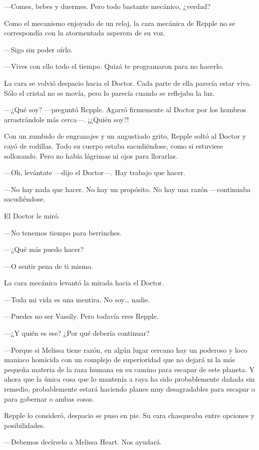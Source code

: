 {---Comes, bebes y duermes. Pero todo bastante mecánico, ¿verdad?}

{Como el mecanismo enjoyado de un reloj, la cara mecánica de Repple no
se correspondía con la atormentada aspereza de su voz.}

{---Sigo sin poder oírlo.}

{---Vives con ello todo el tiempo. Quizá te programaron para no
hacerlo.}

{La cara se volvió despacio hacia el Doctor. Cada parte de ella parecía
	estar viva. Sólo el cristal no se movía, pero lo parecía cuando se
reflejaba la luz.}

{---¿Qué soy? ---preguntó Repple. Agarró firmemente al Doctor por los
hombros arrastrándole más cerca---. ¡¿Quién soy?!}

{Con un zumbido de engranajes y un angustiado grito, Repple soltó al
	Doctor y cayó de rodillas. Todo su cuerpo estaba sacudiéndose, como si
estuviese sollozando. Pero no había lágrimas ni ojos para llorarlas.}

{---Oh, levántate ---dijo el Doctor---. Hay trabajo que hacer.}

{---No hay nada que hacer. No hay un propósito. No hay una razón
---continuaba sacudiéndose.}

{El Doctor le miró.}

{---No tenemos tiempo para berrinches.}

{---¿Qué más puedo hacer?}

{---O sentir pena de ti mismo.}

{La cara mecánica levantó la mirada hacia el Doctor.}

{---Toda mi vida es una mentira. No soy\ldots{} nadie.}

{---Puedes no ser Vassily. Pero todavía eres Repple.}

{---¿Y quién es ese? ¿Por qué debería continuar?}

{---Porque si Melissa tiene razón, en algún lugar cercano hay un
	poderoso y loco maniaco homicida con un complejo de superioridad que no
	dejará ni la más pequeña materia de la raza humana en su camino para
	escapar de este planeta. Y ahora que la única cosa que lo mantenía a
	raya ha sido probablemente dañada sin remedio, probablemente estará
	haciendo planes muy desagradables para escapar o para gobernar o ambas
cosas.}

{Repple lo consideró, despacio se puso en pie. Su cara chasqueaba entre
opciones y posibilidades.}

{---Debemos decírselo a Melissa Heart. Nos ayudará.}

